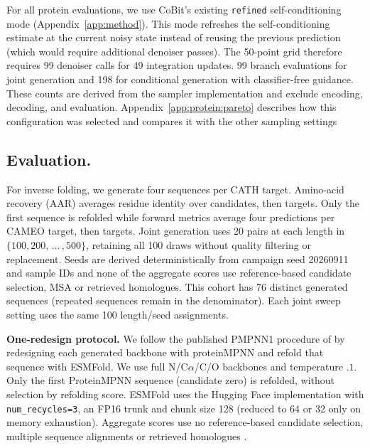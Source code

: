 For all protein evaluations, we use CoBit's existing \texttt{refined} self-conditioning mode (Appendix~\ref{app:method}). This mode refreshes the self-conditioning estimate at the current noisy state instead of reusing the previous prediction (which would require additional denoiser passes). The 50-point grid therefore requires 99 denoiser calls for 49 integration updates. 99 branch evaluations for joint generation and 198 for conditional generation with classifier-free guidance. These counts are derived from the sampler implementation and exclude encoding, decoding, and evaluation. Appendix~\ref{app:protein:pareto} describes how this configuration was selected and compares it with the other sampling settings


\subsection{Evaluation.}
\label{app:protein:metrics}


For inverse folding, we generate four sequences per CATH target. Amino-acid recovery (AAR) averages residue identity over candidates, then targets. Only the first sequence is refolded while forward metrics average four predictions per CAMEO target, then targets. Joint generation uses 20 pairs at each length in $\{100,200, \,...\,,500\}$, retaining all 100 draws without quality filtering or replacement. Seeds are derived deterministically from campaign seed 20260911 and sample IDs and  none of the aggregate scores use reference-based candidate selection, MSA or retrieved homologues. This cohort has 76 distinct generated sequences (repeated sequences remain in the denominator). Each joint sweep setting uses the same 100 length/seed assignments.

\textbf{One-redesign protocol.} We follow the published PMPNN1 procedure of \citet{protein:simpledesign} by redesigning each generated backbone with proteinMPNN and refold that sequence with ESMFold. We use full N/C$\alpha$/C/O backbones and temperature $.1$. Only the first ProteinMPNN sequence (candidate zero) is refolded, without selection by refolding score. ESMFold uses the Hugging Face implementation with \texttt{num\_recycles=3}, an FP16 trunk and chunk size 128 (reduced to 64 or 32 only on memory exhaustion). Aggregate scores use no reference-based candidate selection, multiple sequence alignments or retrieved homologues \citep{protein:proteinmpnn,protein:esmfold}.



